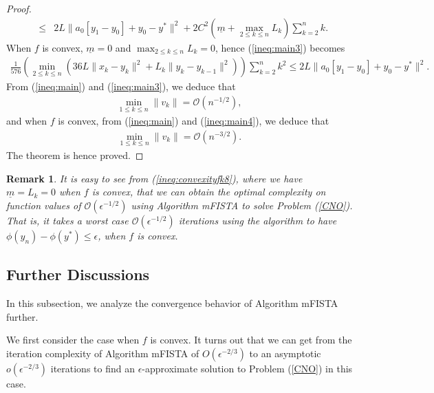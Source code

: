 \documentclass[11pt]{article}
\newtheorem{remark}[thm]{Remark}
\begin{document}
\begin{proof}
\begin{eqnarray}
& \leq & 2 L \|a_{0}[ y_{1} - y_{0}]  + y_{0} - y^\ast \|^2 + 2C^2\left( \underline{m} +  \max_{2 \leq k \leq n} L_k \right)  \sum_{k=2}^n k. \label{ineq:main3}
\end{eqnarray}
When $f$ is convex, $\underline{m} = 0$ and $\max_{2 \leq k \leq n} L_k  = 0$, hence (\ref{ineq:main3}) becomes
\begin{eqnarray}
\frac{1}{576}  \left( \min_{2 \leq k \leq n} \left(36L \| x_k - y_k \|^2 + L_k \| y_k - y_{k-1} \|^2 \right)\right) \sum_{k=2}^{n} k^2 \leq 2 L \|a_{0}[ y_{1} - y_{0}]  + y_{0} - y^\ast \|^2. \label{ineq:main4}
\end{eqnarray}
From (\ref{ineq:main}) and (\ref{ineq:main3}), we deduce that
\begin{eqnarray*}
\min_{1 \leq k \leq n} \| v_k \| = \mathcal{O}(n^{-1/2}),
\end{eqnarray*}
and when $f$ is convex, from (\ref{ineq:main}) and (\ref{ineq:main4}), we deduce that
\begin{eqnarray*}
\min_{1 \leq k \leq n} \| v_k \| = \mathcal{O}(n^{-3/2}).
\end{eqnarray*}
The theorem is hence proved.
\end{proof}

\begin{remark}\label{rem:convexityoptimalfunction}
It is easy to see from (\ref{ineq:convexityfk8}), where we have $\underline{m} = L_k = 0$ when $f$ is convex, that we can obtain the optimal complexity on function values of $\mathcal{O}(\epsilon^{-1/2})$ using Algorithm mFISTA to solve Problem (\ref{CNO}).  That is, it takes a worst case $\mathcal{O}(\epsilon^{-1/2})$ iterations using the algorithm to have $\phi(y_n) - \phi(y^\ast) \leq \epsilon$, when $f$ is convex.
\end{remark}

\subsection{Further Discussions}\label{subsec:discussion}

In this subsection, we analyze the convergence behavior of Algorithm mFISTA further.  %

\vspace{10pt}

\noindent We first consider the case when $f$ is convex.  It turns out that we can get from the iteration complexity of Algorithm mFISTA of $O(\epsilon^{-2/3})$ to an asymptotic $o(\epsilon^{-2/3})$ iterations to find an $\epsilon$-approximate solution to Problem (\ref{CNO}) in this case.   
\end{document}
